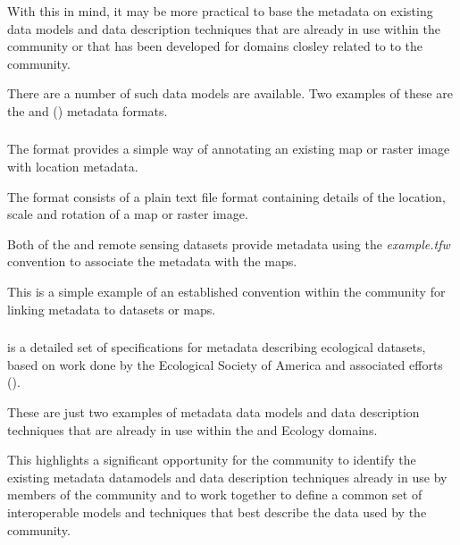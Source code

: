 \documentclass{article}
\begin{document}
With this in mind, it may be more practical to base the \cite{trop}
metadata on existing data models and data description techniques that are
already in use within the \cite{trop} community or that has been developed
for domains closley related to to the \cite{trop} community.

There are a number of such data models are available.
Two examples of these are the  and 
(\cite{eml}) metadata formats.

\subsubsection{}

The  format provides a simple way of annotating
an existing map or raster image with \cite{gis} location metadata.

The \cite{format-world} format consists of a plain text file format containing
details of the location, scale and rotation of a map or raster image.

Both of the \cite{saatchi-2011} and \cite{baccini-2012} remote sensing
datasets provide \cite{format-world} metadata using the \textit{example.tfw}
convention to associate the metadata with the \cite{format-geotiff} maps.

This is a simple example of an established convention within the \cite{gis}
community for linking \cite{gis} metadata to datasets or maps.

\subsubsection{}

\cite{eml} is a detailed set of
specifications for metadata describing ecological datasets, based on
work done by the Ecological Society of America and associated efforts
 (\cite{michener-1997}).

These are just two examples of metadata data models and data description
techniques that are already in use within the \cite{gis} and Ecology domains.

This highlights a significant opportunity for the \cite{trop} community to
identify the existing metadata datamodels and data description techniques
already in use by members of the \cite{trop} community and to work together
to define a common set of interoperable models and techniques that best
describe the data used by the \cite{trop} community.
\end{document}
